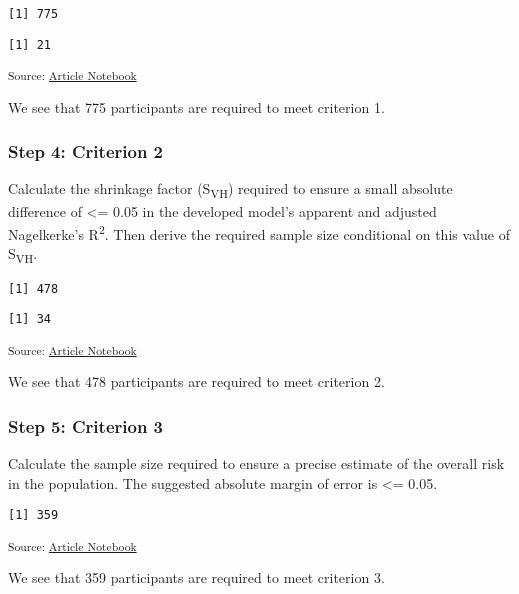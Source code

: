 \documentclass[
  letterpaper,
  DIV=11,
  numbers=noendperiod]{scrartcl}
\begin{document}
\begin{verbatim}
[1] 775
\end{verbatim}

\begin{verbatim}
[1] 21
\end{verbatim}

\textsubscript{Source:
\href{https://AnTangQuoc.github.io/LZD-TP-pred-model/index.qmd.html}{Article
Notebook}}

We see that 775 participants are required to meet criterion 1.

\subsubsection{Step 4: Criterion 2}\label{step-4-criterion-2}

Calculate the shrinkage factor (S\textsubscript{VH}) required to ensure
a small absolute difference of \textless= 0.05 in the developed model's
apparent and adjusted Nagelkerke's R\textsuperscript{2}. Then derive the
required sample size conditional on this value of S\textsubscript{VH}.

\begin{verbatim}
[1] 478
\end{verbatim}

\begin{verbatim}
[1] 34
\end{verbatim}

\textsubscript{Source:
\href{https://AnTangQuoc.github.io/LZD-TP-pred-model/index.qmd.html}{Article
Notebook}}

We see that 478 participants are required to meet criterion 2.

\subsubsection{Step 5: Criterion 3}\label{step-5-criterion-3}

Calculate the sample size required to ensure a precise estimate of the
overall risk in the population. The suggested absolute margin of error
is \textless= 0.05.

\begin{verbatim}
[1] 359
\end{verbatim}

\textsubscript{Source:
\href{https://AnTangQuoc.github.io/LZD-TP-pred-model/index.qmd.html}{Article
Notebook}}

We see that 359 participants are required to meet criterion 3.
\end{document}
